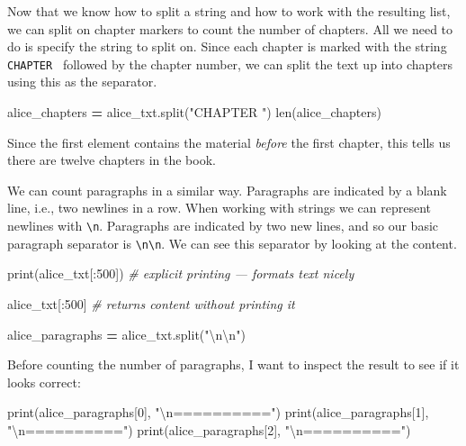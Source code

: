 \documentclass[
]{book}
\newenvironment{Shaded}{\begin{snugshade}}{\end{snugshade}}
\newcommand{\BuiltInTok}[1]{#1}
\newcommand{\CharTok}[1]{\textcolor[rgb]{0.31,0.60,0.02}{#1}}
\newcommand{\CommentTok}[1]{\textcolor[rgb]{0.56,0.35,0.01}{\textit{#1}}}
\newcommand{\DecValTok}[1]{\textcolor[rgb]{0.00,0.00,0.81}{#1}}
\newcommand{\NormalTok}[1]{#1}
\newcommand{\OperatorTok}[1]{\textcolor[rgb]{0.81,0.36,0.00}{\textbf{#1}}}
\newcommand{\StringTok}[1]{\textcolor[rgb]{0.31,0.60,0.02}{#1}}
\begin{document}
Now that we know how to split a string and how to work with the resulting list, we can split on chapter markers to count the number of chapters. All we need to do is specify the string to split on. Since each chapter is marked with the string \texttt{\textquotesingle{}CHAPTER\ \textquotesingle{}} followed by the chapter number, we can split the text up into chapters using this as the separator.

\begin{Shaded}
\begin{Highlighting}[]
\NormalTok{alice_chapters }\OperatorTok{=}\NormalTok{ alice_txt.split(}\StringTok{"CHAPTER "}\NormalTok{)}
\BuiltInTok{len}\NormalTok{(alice_chapters)}
\end{Highlighting}
\end{Shaded}

Since the first element contains the material \emph{before} the first chapter, this tells us there are twelve chapters in the book.

We can count paragraphs in a similar way. Paragraphs are indicated by a blank line, i.e., two newlines in a row. When working with strings we can represent newlines with \texttt{\textbackslash{}n}. Paragraphs are indicated by two new lines, and so our basic paragraph separator is \texttt{\textbackslash{}n\textbackslash{}n}. We can see this separator by looking at the content.

\begin{Shaded}
\begin{Highlighting}[]
\BuiltInTok{print}\NormalTok{(alice_txt[:}\DecValTok{500}\NormalTok{]) }\CommentTok{# explicit printing --- formats text nicely}

\NormalTok{alice_txt[:}\DecValTok{500}\NormalTok{] }\CommentTok{# returns content without printing it}
\end{Highlighting}
\end{Shaded}

\begin{Shaded}
\begin{Highlighting}[]
\NormalTok{alice_paragraphs }\OperatorTok{=}\NormalTok{ alice_txt.split(}\StringTok{"}\CharTok{\textbackslash{}n\textbackslash{}n}\StringTok{"}\NormalTok{)}
\end{Highlighting}
\end{Shaded}

Before counting the number of paragraphs, I want to inspect the result to see if it looks correct:

\begin{Shaded}
\begin{Highlighting}[]
\BuiltInTok{print}\NormalTok{(alice_paragraphs[}\DecValTok{0}\NormalTok{], }\StringTok{"}\CharTok{\textbackslash{}n}\StringTok{=========="}\NormalTok{)}
\BuiltInTok{print}\NormalTok{(alice_paragraphs[}\DecValTok{1}\NormalTok{], }\StringTok{"}\CharTok{\textbackslash{}n}\StringTok{=========="}\NormalTok{)}
\BuiltInTok{print}\NormalTok{(alice_paragraphs[}\DecValTok{2}\NormalTok{], }\StringTok{"}\CharTok{\textbackslash{}n}\StringTok{=========="}\NormalTok{)}
\end{Highlighting}
\end{Shaded}
\end{document}
